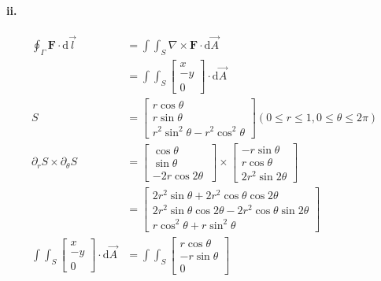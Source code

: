 \documentclass[11pt, a4paper]{article}
\begin{document}
\paragraph{ii.}
$$\begin{aligned}
    \oint_\Gamma \bm{F} \cdot \mathrm{d}\vec{l} &= \int\int_S \nabla \times \bm{F} \cdot \mathrm{d}\vec{A} \\
    &= \int\int_S
    \begin{bmatrix}
        x \\
        -y \\
        0
    \end{bmatrix} \cdot \mathrm{d}\vec{A} \\
    S &= 
    \begin{bmatrix}
        r\cos \theta \\
        r\sin \theta \\
        r^2\sin^2\theta - r^2\cos^2\theta
    \end{bmatrix} (0 \leq r \leq 1, 0 \leq \theta \leq 2\pi) \\
    \partial_rS \times \partial_\theta S &=
    \begin{bmatrix}
        \cos \theta \\
        \sin \theta \\
        -2r\cos2\theta\
    \end{bmatrix} \times
    \begin{bmatrix}
        -r\sin\theta \\
        r\cos\theta \\
        2r^2 \sin2\theta
    \end{bmatrix} \\
    &=
    \begin{bmatrix}
        2r^2\sin\theta+2r^2\cos\theta\cos2\theta \\
        2r^2\sin\theta\cos2\theta-2r^2\cos\theta\sin2\theta \\
        r\cos^2\theta+r\sin^2\theta
    \end{bmatrix} \\
    \int\int_S
    \begin{bmatrix}
        x \\
        -y \\
        0
    \end{bmatrix} \cdot \mathrm{d}\vec{A} &= \int\int_S
    \begin{bmatrix}
        r\cos\theta \\
        -r\sin\theta \\
        0

\end{bmatrix}
\end{aligned}$$
\end{document}
